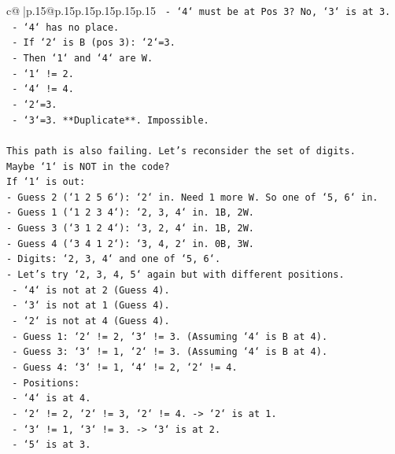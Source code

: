 \documentclass{article}
\begin{document}
{\begin{supertabular}{c@{$\;$}|p{.15\linewidth}@{}p{.15\linewidth}p{.15\linewidth}p{.15\linewidth}p{.15\linewidth}p{.15\linewidth}}
{{{\texttt{            {-} `4` must be at Pos 3? No, `3` is at 3.} \\
\texttt{            {-} `4` has no place.} \\
\texttt{        {-} If `2` is B (pos 3): `2`=3.} \\
\texttt{            {-} Then `1` and `4` are W.} \\
\texttt{            {-} `1` != 2.} \\
\texttt{            {-} `4` != 4.} \\
\texttt{            {-} `2`=3.} \\
\texttt{            {-} `3`=3. **Duplicate**. Impossible.} \\
\\ 
\texttt{This path is also failing. Let's reconsider the set of digits.} \\
\texttt{Maybe `1` is NOT in the code?} \\
\texttt{If `1` is out:} \\
\texttt{{-} Guess 2 (`1 2 5 6`): `2` in. Need 1 more W. So one of `5, 6` in.} \\
\texttt{{-} Guess 1 (`1 2 3 4`): `2, 3, 4` in. 1B, 2W.} \\
\texttt{{-} Guess 3 (`3 1 2 4`): `3, 2, 4` in. 1B, 2W.} \\
\texttt{{-} Guess 4 (`3 4 1 2`): `3, 4, 2` in. 0B, 3W.} \\
\texttt{{-} Digits: `2, 3, 4` and one of `5, 6`.} \\
\texttt{{-} Let's try `2, 3, 4, 5` again but with different positions.} \\
\texttt{    {-} `4` is not at 2 (Guess 4).} \\
\texttt{    {-} `3` is not at 1 (Guess 4).} \\
\texttt{    {-} `2` is not at 4 (Guess 4).} \\
\texttt{    {-} Guess 1: `2` != 2, `3` != 3. (Assuming `4` is B at 4).} \\
\texttt{    {-} Guess 3: `3` != 1, `2` != 3. (Assuming `4` is B at 4).} \\
\texttt{    {-} Guess 4: `3` != 1, `4` != 2, `2` != 4.} \\
\texttt{    {-} Positions:} \\
\texttt{        {-} `4` is at 4.} \\
\texttt{        {-} `2` != 2, `2` != 3, `2` != 4. {-}> `2` is at 1.} \\
\texttt{        {-} `3` != 1, `3` != 3. {-}> `3` is at 2.} \\
\texttt{        {-} `5` is at 3.} \\
}}}
\end{supertabular}}
\end{document}
